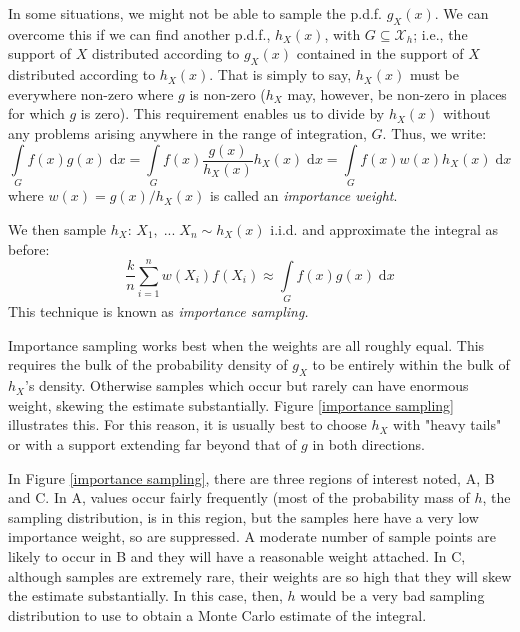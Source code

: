 \documentclass[12pt,a4paper]{article}
\begin{document}
In some situations, we might not be able to sample the p.d.f. $g_X(x)$. We can overcome this if we can find another p.d.f., $h_X(x)$, with $G \subseteq \mathcal{X}_h$; i.e., the support of $X$ distributed according to $g_X(x)$ contained in the support of $X$ distributed according to $h_X(x)$. That is simply to say, $h_X(x)$ must be everywhere non-zero where $g$ is non-zero ($h_X$ may, however, be non-zero in places for which $g$ is zero). This requirement enables us to divide by $h_X(x)$ without any problems arising anywhere in the range of integration, $G$. Thus, we write:
$$\int\limits_G \!\!f(x)g(x)\;\mathrm{d}x = \int\limits_G \!\!f(x) \frac{g(x)}{h_X(x)} h_X(x)\; \mathrm{d}x = \int\limits_G\!\! f(x)w(x) h_X(x) \;\mathrm{d}x$$
where $w(x) = g(x)/h_X(x)$ is called an \emph{importance weight}.

We then sample $h_X$: $X_1, \; ... \; X_n \sim h_X(x)$ i.i.d. and approximate the integral as before:
$$\frac{k}{n} \sum_{i = 1}^n w(X_i)f(X_i) \approx \int\limits_G \!f(x) g(x)\; \mathrm{d}x$$
This technique is known as \emph{importance sampling.}

Importance sampling works best when the weights are all roughly equal. This requires the bulk of the probability density of $g_X$ to be entirely within the bulk of $h_X$'s density. Otherwise samples which occur but rarely can have enormous weight, skewing the estimate substantially. Figure \ref{importance sampling} illustrates this. For this reason, it is usually best to choose $h_X$ with "heavy tails" or with a support extending far beyond that of $g$ in both directions.

In Figure \ref{importance sampling}, there are three regions of interest noted, A, B and C. In A, values occur fairly frequently (most of the probability mass of $h$, the sampling distribution, is in this region, but the samples here have a very low importance weight, so are suppressed. A moderate number of sample points are likely to occur in B and they will have a reasonable weight attached. In C, although samples are extremely rare, their weights are so high that they will skew the estimate substantially. In this case, then, $h$ would be a very bad sampling distribution to use to obtain a Monte Carlo estimate of the integral.
\end{document}
